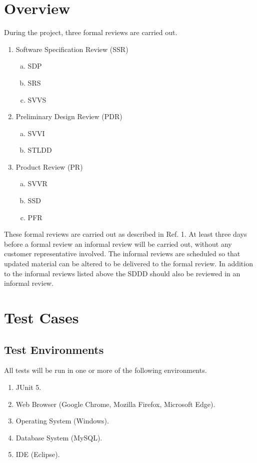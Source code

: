 \documentclass{article}
\begin{document}
\section{Overview}
During the project, three formal reviews are carried out.


\begin{enumerate}
	\item Software Specification Review (SSR)
		\begin{enumerate}[a.] 
			\item SDP
			\item SRS 
			\item SVVS 
		\end{enumerate}
	\item Preliminary Design Review (PDR) 
		\begin{enumerate}[a.]
			\item SVVI
			\item STLDD
		\end{enumerate}
	\item Product Review (PR) 
		\begin{enumerate}[a.]
			\item SVVR 
			\item SSD 
			\item PFR 
		\end{enumerate}
\end{enumerate}

\noindent
These formal reviews are carried out as described in Ref. 1. At least three days before a formal review an informal review will be carried out, without any customer representative involved. The informal reviews are scheduled so that updated material can be altered to be delivered to the formal review. In addition to the informal reviews listed above the SDDD should also be reviewed in an informal review. 

\section{Test Cases}
	\subsection{Test Environments}
	All tests will be run in one or more of the following environments. 
		\begin{enumerate}
			\item JUnit 5.

			\item Web Browser (Google Chrome, Mozilla Firefox, Microsoft Edge).

			\item Operating System (Windows).

			\item Database System (MySQL).

			\item IDE (Eclipse).	
		\end{enumerate}
		
\end{document}
